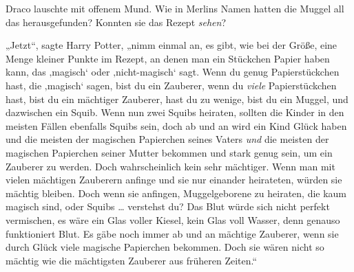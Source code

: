 Draco lauschte mit offenem Mund. Wie in Merlins Namen hatten die Muggel all das herausgefunden? Konnten sie das Rezept \emph{sehen}?

„Jetzt“, sagte Harry Potter, „nimm einmal an, es gibt, wie bei der Größe, eine Menge kleiner Punkte im Rezept, an denen man ein Stückchen Papier haben kann, das ‚magisch‘ oder ‚nicht-magisch‘ sagt. Wenn du genug Papierstückchen hast, die ‚magisch‘ sagen, bist du ein Zauberer, wenn du \emph{viele} Papierstückchen hast, bist du ein mächtiger Zauberer, hast du zu wenige, bist du ein Muggel, und dazwischen ein Squib. Wenn nun zwei Squibs heiraten, sollten die Kinder in den meisten Fällen ebenfalls Squibs sein, doch ab und an wird ein Kind Glück haben und die meisten der magischen Papierchen seines Vaters \emph{und} die meisten der magischen Papierchen seiner Mutter bekommen und stark genug sein, um ein Zauberer zu werden. Doch wahrscheinlich kein sehr mächtiger. Wenn man mit vielen mächtigen Zauberern anfinge und sie nur einander heirateten, würden sie mächtig bleiben. Doch wenn sie anfingen, Muggelgeborene zu heiraten, die kaum magisch sind, oder Squibs … verstehst du? Das Blut würde sich nicht perfekt vermischen, es wäre ein Glas voller Kiesel, kein Glas voll Wasser, denn genauso funktioniert Blut. Es gäbe noch immer ab und an mächtige Zauberer, wenn sie durch Glück viele magische Papierchen bekommen. Doch sie wären nicht so mächtig wie die mächtigsten Zauberer aus früheren Zeiten.“

